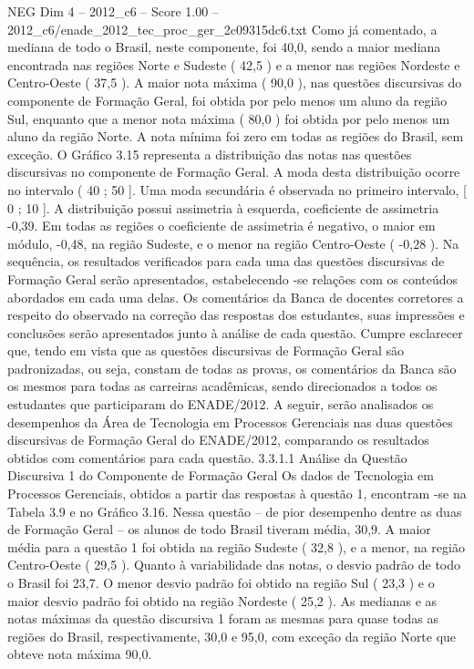 \begin{textsample}{NEG Dim 4 – 2012\_c6 – Score 1.00 – 2012\_c6/enade\_2012\_tec\_proc\_ger\_2c09315dc6.txt}
Como já comentado, a mediana de todo o Brasil, neste componente, foi 40,0, sendo a maior mediana encontrada nas regiões Norte e Sudeste ( 42,5 ) e a menor nas regiões Nordeste e Centro-Oeste ( 37,5 ).
A maior nota máxima ( 90,0 ), nas questões discursivas do componente de Formação Geral, foi obtida por pelo menos um aluno da região Sul, enquanto que a menor nota máxima ( 80,0 ) foi obtida por pelo menos um aluno da região Norte.
A nota mínima foi zero em todas as regiões do Brasil, sem exceção.
O Gráfico 3.15 representa a distribuição das notas nas questões discursivas no componente de Formação Geral.
A moda desta distribuição ocorre no intervalo ( 40 ; 50 ].
Uma moda secundária é observada no primeiro intervalo, [ 0 ; 10 ].
A distribuição possui assimetria à esquerda, coeficiente de assimetria -0,39.
Em todas as regiões o coeficiente de assimetria é negativo, o maior em módulo, -0,48, na região Sudeste, e o menor na região Centro-Oeste ( -0,28 ).
Na sequência, os resultados verificados para cada uma das questões discursivas de Formação Geral serão apresentados, estabelecendo -se relações com os conteúdos abordados em cada uma delas.
Os comentários da Banca de docentes corretores a respeito do observado na correção das respostas dos estudantes, suas impressões e conclusões serão apresentados junto à análise de cada questão.
Cumpre esclarecer que, tendo em vista que as questões discursivas de Formação Geral são padronizadas, ou seja, constam de todas as provas, os comentários da Banca são os mesmos para todas as carreiras acadêmicas, sendo direcionados a todos os estudantes que participaram do ENADE/2012.
A seguir, serão analisados os desempenhos da Área de Tecnologia em Processos Gerenciais nas duas questões discursivas de Formação Geral do ENADE/2012, comparando os resultados obtidos com comentários para cada questão. 3.3.1.1 Análise da Questão Discursiva 1 do Componente de Formação Geral Os dados de Tecnologia em Processos Gerenciais, obtidos a partir das respostas à questão 1, encontram -se na Tabela 3.9 e no Gráfico 3.16.
Nessa questão – de pior desempenho dentre as duas de Formação Geral – os alunos de todo Brasil tiveram média, 30,9.
A maior média para a questão 1 foi obtida na região Sudeste ( 32,8 ), e a menor, na região Centro-Oeste ( 29,5 ).
Quanto à variabilidade das notas, o desvio padrão de todo o Brasil foi 23,7.
O menor desvio padrão foi obtido na região Sul ( 23,3 ) e o maior desvio padrão foi obtido na região Nordeste ( 25,2 ).
As medianas e as notas máximas da questão discursiva 1 foram as mesmas para quase todas as regiões do Brasil, respectivamente, 30,0 e 95,0, com exceção da região Norte que obteve nota máxima 90,0.

\end{textsample}

